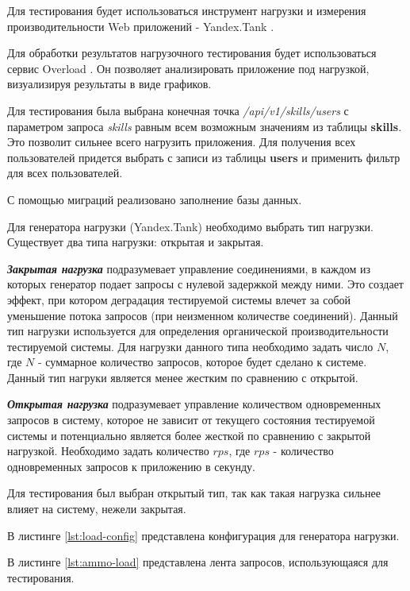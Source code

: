 Для тестирования будет использоваться инструмент нагрузки и измерения производительности Web приложений - Yandex.Tank \cite{yandex-tank}.

Для обработки результатов нагрузочного тестирования будет использоваться сервис Overload \cite{yandex-overload}. Он позволяет анализировать приложение под нагрузкой, визуализируя результаты в виде графиков.

Для тестирования была выбрана конечная точка \textit{/api/v1/skills/users} с 
параметром запроса \textit{skills} равным всем возможным значениям из таблицы \textbf{skills}.  
Это позволит сильнее всего нагрузить приложения.
Для получения всех пользователей придется выбрать с записи из таблицы \textbf{users} и применить фильтр для всех пользователей.  

С помощью миграций реализовано заполнение базы данных.  

Для генератора нагрузки (Yandex.Tank) необходимо выбрать тип нагрузки.  
Существует два типа нагрузки: открытая и закрытая.  

\textbf{\textit{Закрытая нагрузка}} подразумевает управление соединениями, в каждом из которых генератор подает запросы с нулевой задержкой между ними. Это создает эффект, при котором деградация тестируемой системы влечет за собой уменьшение потока запросов (при неизменном количестве соединений). Данный тип нагрузки используется для определения органической производительности тестируемой системы. 
Для нагрузки данного типа необходимо задать число $N$, где $N$ - суммарное количество запросов, которое будет сделано к системе. 
Данный тип нагруки является менее жестким по сравнению с открытой.

\textbf{\textit{Открытая нагрузка}} подразумевает управление количеством одновременных запросов в систему, которое не зависит от текущего состояния тестируемой системы и потенциально является более жесткой по сравнению с закрытой нагрузкой. Необходимо задать количество $rps$, где $rps$ - количество одновременных запросов к приложению в секунду.  

Для тестирования был выбран открытый тип, так как такая нагрузка сильнее влияет на систему, нежели закрытая.  

\newpage

В листинге \ref{lst:load-config} представлена конфигурация для генератора нагрузки.


\newpage
В листинге \ref{lst:ammo-load} представлена лента запросов, использующаяся для тестирования.

